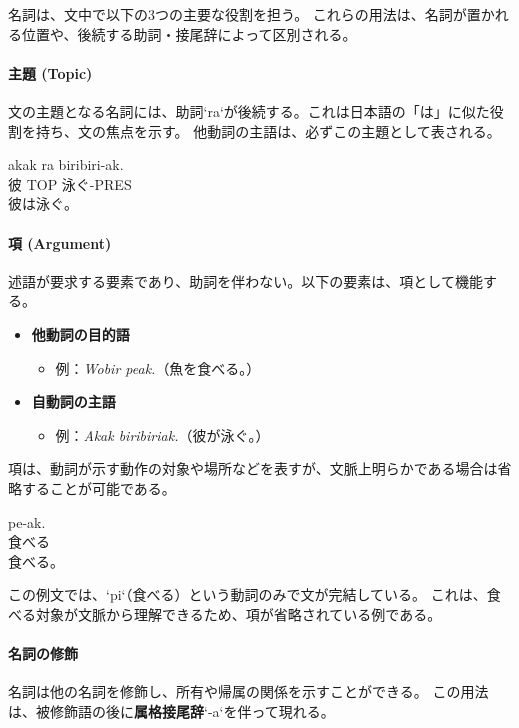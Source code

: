 名詞は、文中で以下の3つの主要な役割を担う。
これらの用法は、名詞が置かれる位置や、後続する助詞・接尾辞によって区別される。

\paragraph{主題 (Topic)}
文の主題となる名詞には、助詞`ra`が後続する。これは日本語の「は」に似た役割を持ち、文の焦点を示す。
他動詞の主語は、必ずこの主題として表される。

\begin{exe}
    \ex \gll akak ra biribiri-ak.\\
        彼 TOP 泳ぐ-PRES\\
    \glt 彼は泳ぐ。
\end{exe}

\paragraph{項 (Argument)}
述語が要求する要素であり、助詞を伴わない。以下の要素は、項として機能する。

\begin{itemize}
    \item \textbf{他動詞の目的語}
    \begin{itemize}
        \item 例：\textit{Wobir peak.}（魚を食べる。）
    \end{itemize}

    \item \textbf{自動詞の主語}
    \begin{itemize}
        \item 例：\textit{Akak biribiriak.}（彼が泳ぐ。）
    \end{itemize}
\end{itemize}

項は、動詞が示す動作の対象や場所などを表すが、文脈上明らかである場合は省略することが可能である。

\begin{exe}
    \ex \gll pe-ak.\\
        食べる\\
    \glt 食べる。
\end{exe}
この例文では、`pi`（食べる）という動詞のみで文が完結している。
これは、食べる対象が文脈から理解できるため、項が省略されている例である。

\paragraph{名詞の修飾}
名詞は他の名詞を修飾し、所有や帰属の関係を示すことができる。
この用法は、被修飾語の後に\textbf{属格接尾辞}`-a`を伴って現れる。

